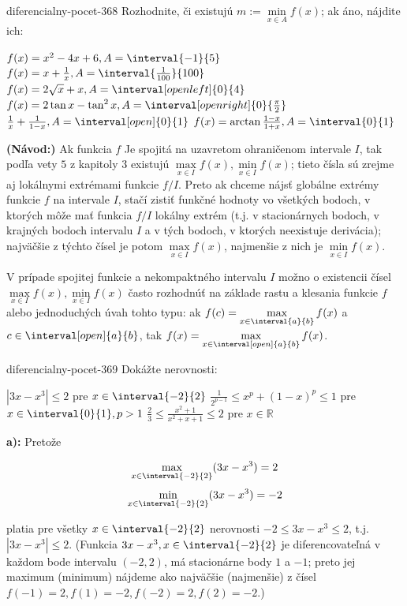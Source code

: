 \begin{defproblem}{diferencialny-pocet-368}
Rozhodnite, či existujú $m:=\min\limits_{x \in A}f(x)$; ak áno, nájdite ich:
\begin{tasks}
  \task $f(x)=x^2-4x+6,A=\interval{-1}{5}$
  \task $f(x)=x+\frac{1}{x},A=\interval{\frac{1}{100}}{100}$
  \task $f(x)=2\sqrt{x}+x,A=\interval[open left]{0}{4}$
  \task $f(x)=2\tan x-\tan^2 x,A=\interval[open right]{0}{\frac{\pi}{2}}$
  \task $\frac{1}{x}+\frac{1}{1-x},A=\interval[open]{0}{1}$
  \task $f(x)=\arctan \frac{1-x}{1+x},A=\interval{0}{1}$
\end{tasks}

\begin{solution}
  \textbf{(Návod:)}
  Ak funkcia $f$ Je spojitá na uzavretom ohraničenom intervale $I$, tak podľa
  vety $5$ z kapitoly $3$ existujú $\max\limits_{x\in I}f(x),\min\limits_{x\in
  I}f(x)$; tieto čísla sú zrejme aj lokálnymi extrémami funkcie $f/I$. Preto ak
  chceme nájsť globálne extrémy funkcie $f$ na intervale $I$, stačí zistiť
  funkčné hodnoty vo všetkých bodoch, v ktorých môže mať funkcia $f/I$ lokálny
  extrém (t.j. v stacionárnych bodoch, v krajných bodoch intervalu $I$ a v tých
  bodoch, v ktorých neexistuje derivácia); najväčšie z týchto čísel je potom
  $\max\limits_{x\in I}f(x)$, najmenšie z nich je $\min\limits_{x\in I}f(x)$.

  V prípade spojitej funkcie a nekompaktného intervalu $I$ možno o existencii
  čísel $\max\limits_{x\in I}f(x),\min\limits_{x\in I}f(x)$ často rozhodnúť na
  základe rastu a klesania funkcie $f$ alebo jednoduchých úvah tohto typu: ak
  $f(c)=\max\limits_{x\in \interval{a}{b}}f(x)$ a $c\in \interval[open]{a}{b}$,
  tak $f(x)=\max\limits_{x\in \interval[open]{a}{b}}f(x)$.
\end{solution}
\end{defproblem}

\begin{defproblem}{diferencialny-pocet-369}
Dokážte nerovnosti:
\begin{tasks}
\task $|3x-x^3|\leq 2$ pre $x\in \interval{-2}{2}$
\task $\frac{1}{2^{p-1}}\leq x^p+(1-x)^p\leq 1$ pre $x\in \interval{0}{1},p>1$
\task $\frac{2}{3}\leq \frac{x^2+1}{x^2+x+1}\leq 2$ pre $x\in\mathbb{R}$
\end{tasks}

\begin{solution}
  \textbf{a):}
  Pretože
  \begin{multicols}{2}
    \[ \max\limits_{x\in \interval{-2}{2}}(3x-x^3)=2 \]
    \[ \min\limits_{x\in \interval{-2}{2}}(3x-x^3)=-2 \]
  \end{multicols}
  platia pre všetky $x\in \interval{-2}{2}$ nerovnosti $-2\leq 3x-x^3\leq 2$,
  t.j. $|3x-x^3|\leq 2$. (Funkcia $3x-x^3,x\in \interval{-2}{2}$ je
  diferencovateľná v každom bode intervalu $(-2,2)$, má stacionárne body $1$ a
  $-1$; preto jej maximum (minimum) nájdeme ako najväčšie (najmenšie) z čísel
  $f(-1)=2,f(1)=-2,f(-2)=2,f(2)=-2$.)
\end{solution}
\end{defproblem}

